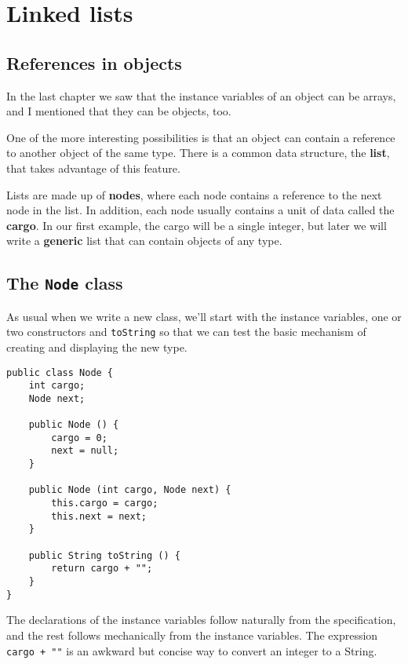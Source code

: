 



\chapter{Linked lists}
\label{chap14}
\label{list}

\section{References in objects}

In the last chapter we saw that the instance variables of an
object can be arrays, and I mentioned that they can be objects,
too.

One of the more interesting possibilities is that an object
can contain a reference to another object of the same type.
There is a common data structure, the {\bf list}, that takes advantage
of this feature.

Lists are made up of {\bf nodes}, where each node contains a
reference to the next node in the list.  In addition, each node
usually contains a unit of data called the {\bf cargo}.  In our
first example, the cargo will be a single integer, but later we
will write a {\bf generic} list that can contain objects
of any type.


\section{The {\tt Node} class}

As usual when we write a new class, we'll start with the instance
variables, one or two constructors and {\tt toString} so that we
can test the basic mechanism of creating and displaying the new
type.

\begin{verbatim}
public class Node {
    int cargo;
    Node next;

    public Node () {
        cargo = 0;
        next = null;
    }

    public Node (int cargo, Node next) {
        this.cargo = cargo;
        this.next = next;
    }

    public String toString () {
        return cargo + "";
    }
}
\end{verbatim}
%
The declarations of the instance variables follow naturally
from the specification, and the rest follows mechanically from
the instance variables.  The expression {\tt cargo + ""} is
an awkward but concise way to convert an integer to a String.

